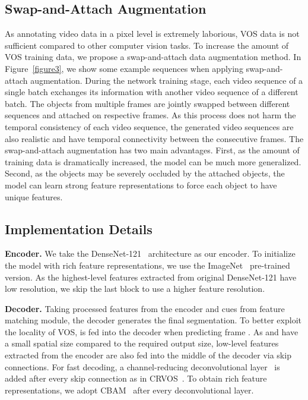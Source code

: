 \documentclass[runningheads]{llncs}
\begin{document}
\subsection{Swap-and-Attach Augmentation}
As annotating video data in a pixel level is extremely laborious, VOS data is not sufficient compared to other computer vision tasks. To increase the amount of VOS training data, we propose a swap-and-attach data augmentation method. In Figure~\ref{figure3}, we show some example sequences when applying swap-and-attach augmentation. During the network training stage, each video sequence of a single batch exchanges its information with another video sequence of a different batch. The objects from multiple frames are jointly swapped between different sequences and attached on respective frames. As this process does not harm the temporal consistency of each video sequence, the generated video sequences are also realistic and have temporal connectivity between the consecutive frames. The swap-and-attach augmentation has two main advantages. First, as the amount of training data is dramatically increased, the model can be much more generalized. Second, as the objects may be severely occluded by the attached objects, the model can learn strong feature representations to force each object to have unique features. 


\subsection{Implementation Details}
\noindent\textbf{Encoder.} We take the DenseNet-121~\cite{densenet} architecture as our encoder. To initialize the model with rich feature representations, we use the ImageNet~\cite{imagenet} pre-trained version. As the highest-level features extracted from original DenseNet-121 have low resolution, we skip the last block to use a higher feature resolution. 


\noindent\textbf{Decoder.} Taking processed features from the encoder and cues from feature matching module, the decoder generates the final segmentation. To better exploit the locality of VOS,  is fed into the decoder when predicting frame . As  and  have a small spatial size compared to the required output size, low-level features extracted from the encoder are also fed into the middle of the decoder via skip connections. For fast decoding, a channel-reducing deconvolutional layer~\cite{deconv} is added after every skip connection as in CRVOS~\cite{CRVOS}. To obtain rich feature representations, we adopt CBAM~\cite{CBAM} after every deconvolutional layer. 
\end{document}
